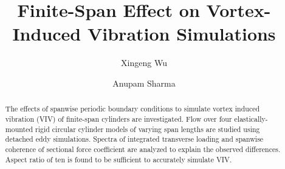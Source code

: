 \documentclass[12pt,preprint]{elsarticle}
\begin{document}
\begin{frontmatter}



\title{Finite-Span Effect on Vortex-Induced Vibration Simulations}


\author[1]{Xingeng Wu}
\author[2]{Anupam Sharma}

\address{Department of Aerospace Engineering, Iowa State University, Ames,
Iowa, 50011}


\begin{abstract}
  The effects of spanwise periodic boundary conditions to simulate vortex
  induced vibration (VIV) of finite-span cylinders are investigated. Flow over
  four elastically-mounted rigid circular cylinder models of varying span
  lengths are studied using detached eddy simulations. Spectra of integrated
  transverse loading and spanwise coherence of sectional force coefficient are
  analyzed to explain the observed differences. Aspect ratio of ten is found to
  be sufficient to accurately simulate VIV.
\end{abstract}

%
\end{frontmatter}


\end{document}

